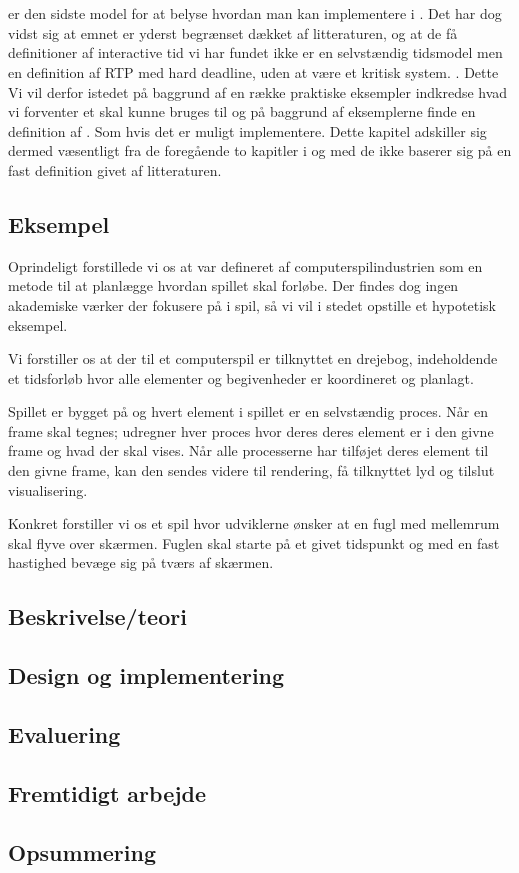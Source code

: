 \chapter{\is}
\label{chap:is}

\is er den sidste model for at belyse hvordan man kan implementere i \pycsp. Det har dog vidst sig at emnet er yderst begrænset dækket af litteraturen, og at de få definitioner af interactive tid vi har fundet ikke er en selvstændig tidsmodel men en definition af RTP med hard deadline, uden at være et kritisk system. \cite{?}. Dette Vi vil derfor istedet på baggrund af en række praktiske eksempler indkredse hvad vi forventer et \is skal kunne bruges til og på  baggrund af eksemplerne finde en definition af \is. Som hvis det er muligt implementere. Dette kapitel adskiller sig dermed væsentligt fra de foregående to kapitler i og med de ikke baserer sig på en fast definition givet af litteraturen. 

\section{Eksempel}
Oprindeligt forstillede vi os at \is var defineret af computerspilindustrien som en metode til at planlægge hvordan spillet skal forløbe. Der findes dog ingen akademiske værker der fokusere på \is i spil, så vi vil i stedet opstille et hypotetisk eksempel. 

Vi forstiller os at der til et computerspil er tilknyttet en drejebog, indeholdende et tidsforløb hvor alle elementer og begivenheder er koordineret og planlagt. 

Spillet er bygget på \pycsp og hvert element i spillet er en selvstændig proces. Når en frame skal tegnes; udregner hver proces hvor deres deres element er i den givne frame og hvad der skal vises. Når alle processerne har tilføjet deres element til den givne frame, kan den sendes videre til rendering, få tilknyttet lyd og tilslut visualisering. 

Konkret forstiller vi os et spil hvor udviklerne ønsker at en fugl med mellemrum skal flyve over skærmen. Fuglen skal starte på et givet tidspunkt og med en fast hastighed bevæge sig på tværs af skærmen.

  \section{Beskrivelse/teori}
  \section{Design og implementering}
  \section{Evaluering}
  \section{Fremtidigt arbejde}
  \section{Opsummering}

